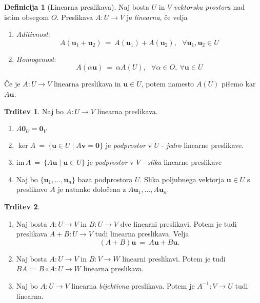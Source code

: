 \documentclass[11pt]{article}
\renewcommand{\u}{\mathbf{u}}
\newcommand{\vv}{\mathbf{v}}
\newcommand{\0}{\mathbf{0}}
\newcommand{\im}{\text{im}\,}
\theoremstyle{definition}
\newtheorem{definicija}{Definicija}[section]
\theoremstyle{definition}
\newtheorem{trditev}{Trditev}[section]
\theoremstyle{definition}
\theoremstyle{definition}
\begin{document}
\begin{definicija}[Linearna preslikava]

Naj bosta $U$ in $V$ \textit{vektorska prostora} nad istim obsegom $O$. Preslikava $A: U \rightarrow V$ je \textit{linearna}, če velja
\begin{enumerate}
	\item \textit{Aditivnost}: 
	$$A(\u_1 + \u_2) ~=~ A(\u_1) + A(\u_2), ~~~\forall \u_1, \u_2  \in U$$
	\item \textit{Homogenost}:
	$$A(\alpha\u) ~=~ \alpha A(U), ~~~\forall \alpha \in O, ~\forall \u \in U$$
\end{enumerate} 
Če je $A:U \rightarrow V$ linearna preslikava in $\u \in U$, potem namesto $A(U)$ pišemo kar $A\u$.

\end{definicija}
\vspace{0.5cm}

\begin{trditev}

Naj bo $A: U \rightarrow V$ linearna preslikava.
\begin{enumerate}
	\item $A\0_U = \0_V$
	\item $\ker A ~=~ \{\u\in U \mid A\vv = \0 \}$ je \textit{podprostor} v $U$ - \textit{jedro} linearne preslikave.
	\item $\im A ~=~ \{A\u \mid \u \in U\}$ je \textit{podprostor} v $V$ - \textit{slika} linearne preslikave
	\item Naj bo $\{\u_1,\ldots,\u_n\}$ baza podprostora $U$. Slika poljubnega vektorja $\u\in U$ s preslikavo $A$ je natanko določena z $A\u_1,\ldots,A\u_n$.
\end{enumerate}

\end{trditev}
\vspace{0.5cm}

\begin{trditev}
~
\begin{enumerate}

\item Naj bosta $A: U \rightarrow V$ in $B: U \rightarrow V$ dve linearni preslikavi. Potem je tudi preslikava $A+B: U \rightarrow V$ tudi linearna preslikava. Velja
$$(A+B)\u ~=~ A\u + B\u.$$

\item Naj bosta $A: U \rightarrow V$ in $B: V \rightarrow W$ linearni preslikavi. Potem je tudi $BA := B \circ A: U \rightarrow W$ linearna preslikava.

\item Naj bo $A: U \rightarrow V$ linearna \textit{bijektivna} preslikava. Potem je $A^{-1}: V \rightarrow U$ tudi linearna.

\end{enumerate}

\end{trditev}
\vspace{0.5cm}
\end{document}
